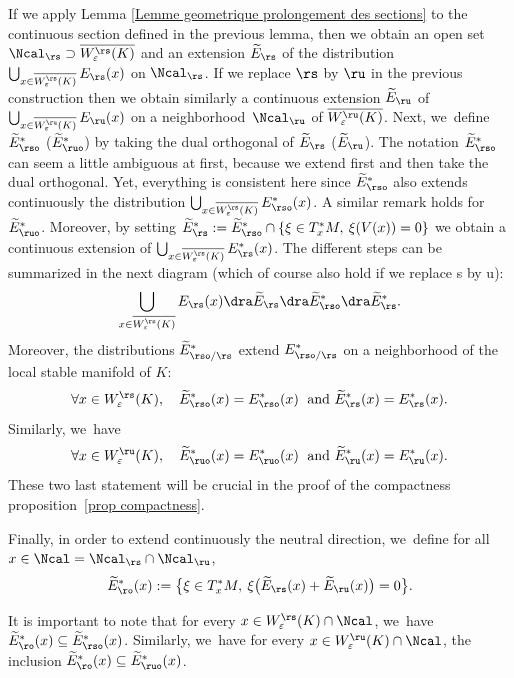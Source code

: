 If we apply Lemma \ref{Lemme geometrique prolongement des sections} to the continuous section defined in the previous lemma, then we obtain an open set $\Ncal_{\rs} \supset \overline{W_{\varepsilon}^\rs (K)} $ and an extension $\widetilde{E}_\rs$ of the distribution $\bigcup_{x \in \overline{W_{\varepsilon}^\rs (K)}}E_{\rs} (x)$ on $\Ncal_{\rs}$. If we replace $\rs$ by $\ru$ in the previous construction then we obtain similarly a continuous extension $\widetilde{E}_\ru$ of $ \bigcup_{x \in \overline{W_{\varepsilon}^\ru (K)}} E_{\ru} (x)$ on a neighborhood~$\Ncal_\ru$ of $\overline{W_{\varepsilon}^\ru (K)}$.
Next, we~define $ \widetilde{E}_{\rso}^*$ (\resp $\widetilde{E}_{\ruo}^*$) by taking the dual orthogonal of $\widetilde{E}_\rs$ (\resp $\widetilde{E}_\ru$). The notation $\widetilde{E}_{\rso}^*$ can seem a little ambiguous at first, because we extend first and then take the dual orthogonal. Yet, everything is consistent here since $\widetilde{E}_{\rso}^*$ also extends continuously the distribution $\bigcup_{x \in \overline{W_{\varepsilon}^\rs (K)}} E_{\rso}^* (x)$. A similar remark holds for $\widetilde{E}_{\ruo}^*$. Moreover, by setting $\widetilde{E}_\rs^*:= \widetilde{E}_{\rso}^* \cap \{\xi \in T_x^*M, \: \xi(V(x)) = 0\}$ we obtain a continuous extension of $\bigcup_{x \in \overline{W_{\varepsilon}^\rs (K)}}E_{\rs}^* (x)$. The different steps can be summarized in the next diagram (which of course also hold if we replace s by u):
\[
\bigcup_{x \in \overline{W_{\varepsilon}^\rs (K)}} E_\rs (x) \dra \widetilde{E}_\rs \dra \widetilde{E}_{\rso}^* \dra \widetilde{E}_\rs^*.
\]
Moreover, the distributions $\widetilde{E}_{\rso/\rs}^* $ extend $E_{\rso/\rs}^*$ on a neighborhood of the local stable manifold of $K$:
\[
\forall x \in W_{\varepsilon}^\rs (K), \quad \widetilde{E}_{\rso}^* (x) = E_{\rso}^* (x) \;\text{ and } \widetilde{E}_\rs^* (x) = E_\rs^* (x).
\]
Similarly, we~have
\[
\forall x \in W_{\varepsilon}^\ru (K), \quad \widetilde{E}_{\ruo}^* (x) = E_{\ruo}^* (x) \;\text{ and } \widetilde{E}_\ru^* (x) = E_\ru^* (x).
\]
These two last statement will be crucial in the proof of the compactness proposition~\ref{prop compactness}.

Finally, in order to extend continuously the neutral direction, we~define for all $x \in \Ncal =\Ncal_{\rs} \cap \Ncal_\ru$,
\[
\widetilde{E}_\ro^* (x):= \bigl\{ \xi \in T_x^* M, \: \xi \bigl(\widetilde{E}_\rs(x) + \widetilde{E}_\ru(x)\bigr) = 0 \bigr\}.
\]

\begin{remark}\label{remark: upper triangular block matrices}
It is important to note that for every $x \in W_{\varepsilon}^{\rs} (K) \cap \Ncal$, we~have $\widetilde{E}_\ro^* (x) \subseteq \widetilde{E}_{\rso}^* (x)$. Similarly, we~have for every $x \in W_{\varepsilon}^{\ru} (K) \cap \Ncal$, the inclusion $\widetilde{E}_\ro^* (x) \subseteq \widetilde{E}_{\ruo}^* (x)$.
\end{remark}

